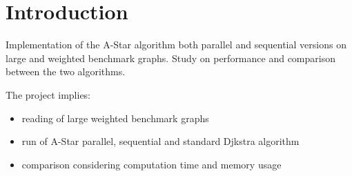 \section{Introduction}
\label{Sec:intro}

Implementation of the A-Star algorithm both parallel and sequential versions on large and weighted benchmark graphs.
Study on performance and comparison between the two algorithms.

The project implies:
\begin{itemize}
    \item reading of large weighted benchmark graphs
    \item run of A-Star parallel, sequential and standard Djkstra algorithm
    \item comparison considering computation time and memory usage
\end{itemize}